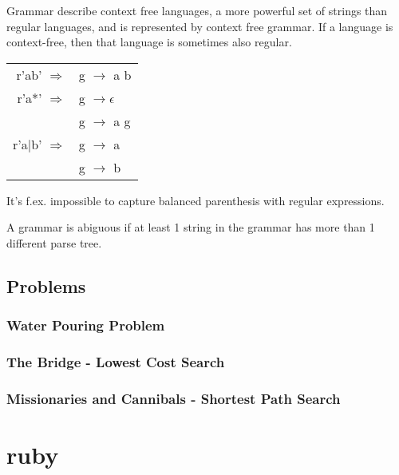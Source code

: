 \documentclass[12pt]{article}
\begin{document}
Grammar describe context free languages, a more powerful set of strings than regular languages, and is represented by context free grammar. If a language is context-free, then that language is sometimes also regular.

\begin{tabular}{r l}
	r'ab' $\Rightarrow$ & g $\rightarrow$ a b \\
	r'a*' $\Rightarrow$ & g $\rightarrow \epsilon$ \\
	& g $\rightarrow$ a g \\
	r'a$|$b' $\Rightarrow$ & g $\rightarrow$ a \\
	& g $\rightarrow$ b \\	
\end{tabular}

It's f.ex. impossible to capture balanced parenthesis with regular expressions.

A grammar is abiguous if at least 1 string in the grammar has more than 1 different parse tree.



\subsection{Problems}


\subsubsection{Water Pouring Problem}




\subsubsection{The Bridge - Lowest Cost Search}




\subsubsection{Missionaries and Cannibals - Shortest Path Search}





\section{ruby}
\end{document}
